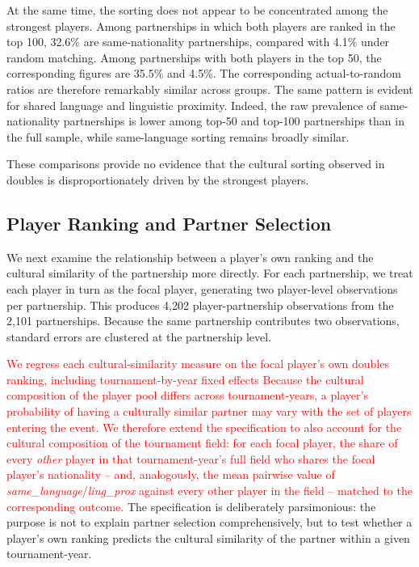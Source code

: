 \documentclass[10pt]{article}
\begin{document}
At the same time, the sorting does not appear to be concentrated among the strongest players. Among partnerships in which both players are ranked in the top 100, 32.6\% are same-nationality partnerships, compared with 4.1\% under random matching. Among partnerships with both players in the top 50, the corresponding figures are 35.5\% and 4.5\%. The corresponding actual-to-random ratios are therefore remarkably similar across groups. The same pattern is evident for shared language and linguistic proximity. Indeed, the raw prevalence of same-nationality partnerships is lower among top-50 and top-100 partnerships than in the full sample, while same-language sorting remains broadly similar.

These comparisons provide no evidence that the cultural sorting observed in doubles is disproportionately driven by the strongest players.

\subsection{Player Ranking and Partner Selection}

We next examine the relationship between a player's own ranking and the cultural similarity of the partnership more directly. For each partnership, we treat each player in turn as the focal player, generating two player-level observations per partnership. This produces 4,202 player-partnership observations from the 2,101 partnerships. Because the same partnership contributes two observations, standard errors are clustered at the partnership level.

\textcolor{red}{We regress each cultural-similarity measure on the focal player's own doubles ranking, including tournament-by-year fixed effects} 
\textcolor{red}{Because the cultural composition of the player pool differs across tournament-years, a player's probability of having a culturally similar partner may vary with the set of players entering the event. We therefore extend the specification to also account for the cultural composition of the tournament field: for each focal player, the share of every \emph{other} player in that tournament-year's full field who shares the focal player's nationality -- and, analogously, the mean pairwise value of \textit{same\_language}/\textit{ling\_prox} against every other player in the field -- matched to the corresponding outcome.}
The specification is deliberately parsimonious: the purpose is not to explain partner selection comprehensively, but to test whether a player's own ranking predicts the cultural similarity of the partner within a given tournament-year.
\end{document}
